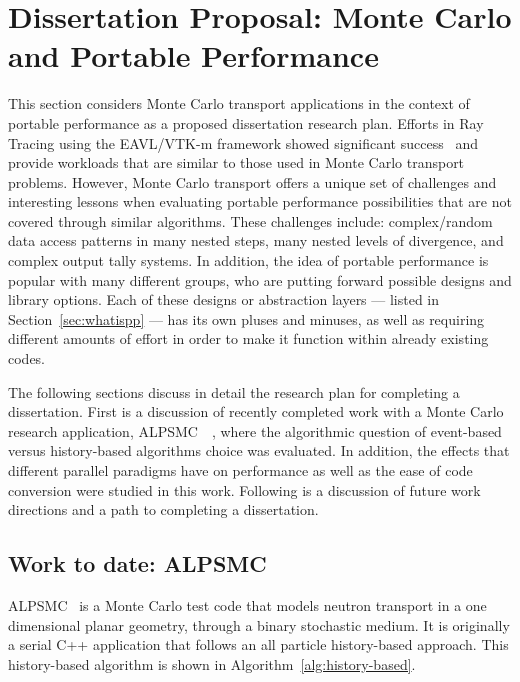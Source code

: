 \section{\textbf{Dissertation Proposal: Monte Carlo and Portable Performance}}

This section considers Monte Carlo transport applications in the context of portable performance as a proposed dissertation research plan.
%
Efforts in Ray Tracing using the EAVL/VTK-m framework showed significant success~\cite{larsen2015ray} and provide workloads that are similar to those used in Monte Carlo transport problems.
%
However, Monte Carlo transport offers a unique set of challenges and interesting lessons when evaluating portable performance possibilities that are not covered through similar algorithms.
%
These challenges include: complex/random data access patterns in many nested steps, many nested levels of divergence, and complex output tally systems.
%
In addition, the idea of portable performance is popular with many different groups, who are putting forward possible designs and library options.
%
Each of these designs or abstraction layers --- listed in Section~\ref{sec:whatispp} --- has its own pluses and minuses, as well as requiring different amounts of effort in order to make it function within already existing codes.
%

%
The following sections discuss in detail the research plan for completing a dissertation.
%
First is a discussion of recently completed work with a Monte Carlo research application, ALPSMC~\cite{alpsmc1}~\cite{alpsmc2}, where the algorithmic question of event-based versus history-based algorithms choice was evaluated.
%
In addition, the effects that different parallel paradigms have on performance as well as the ease of code conversion were studied in this work.
%
Following is a discussion of future work directions and a path to completing a dissertation.

\subsection{\textbf{Work to date: ALPSMC}}

ALPSMC~\cite{brantley2011benchmark} is a Monte Carlo test code that models neutron transport in a one dimensional planar geometry, through a binary stochastic medium.
%
It is originally a serial C++ application that follows an all particle history-based approach.
%
This history-based algorithm is shown in Algorithm~\ref{alg:history-based}.
%

